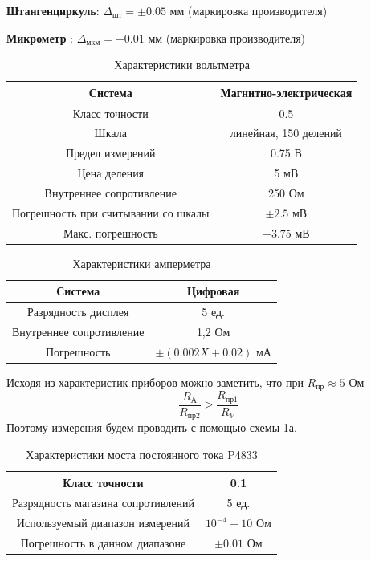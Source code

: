 \documentclass[a4paper,12pt]{article} %
\begin{document}
\textbf{Штангенциркуль}: $\Delta_{\text{шт}} = \pm 0.05$ мм (маркировка производителя)

\textbf{Микрометр} : $\Delta_{\text{мкм}} = \pm 0.01$ мм (маркировка производителя)

\begin{table}
\caption{Характеристики вольтметра}
\begin{tabular}{|c|c|}
\hline 
Система & Магнитно-электрическая \\ 
\hline 
Класс точности & 0.5 \\ 
\hline 
Шкала & линейная, 150 делений  \\ 
\hline 
Предел измерений & 0.75 В \\ 
\hline 
Цена деления & 5 мВ \\ 
\hline 
Внутреннее сопротивление & 250 Ом \\ 
\hline 
Погрешность при считывании со шкалы & $\pm 2.5$ мВ \\ 
\hline 
Макс. погрешность & $\pm3.75$ мВ \\ 
\hline 
\end{tabular} 
\end{table}

\begin{table}
\caption{Характеристики амперметра}
\begin{tabular}{|c|c|}
\hline 
Система & Цифровая \\  
\hline 
Разрядность дисплея & 5 ед. \\ 
\hline 
Внутреннее сопротивление & 1,2 Ом \\ 
\hline 
Погрешность & $\pm (0.002X+0.02)$ мА \\ 
\hline 
\end{tabular} 
\end{table}
Исходя из характеристик приборов можно заметить, что при $R_{\text{пр}} \approx 5$ Ом
\[\frac{R_{\text{А}}}{R_{\text{пр2}}} > \frac{R_{\text{пр1}}}{R_V}\]
Поэтому измерения будем проводить с помощью схемы 1а.

\begin{table}
\caption{Характеристики моста постоянного тока P4833}
\begin{tabular}{|c|c|}
\hline 
Класс точности & 0.1 \\ 
\hline 
Разрядность магазина сопротивлений & 5 ед. \\ 
\hline 
Используемый диапазон измерений & $10^{-4} - 10$ Ом \\ 
\hline 
Погрешность в данном диапазоне & $\pm 0.01$ Ом \\  
\hline 
\end{tabular} 
\end{table}
\end{document}
